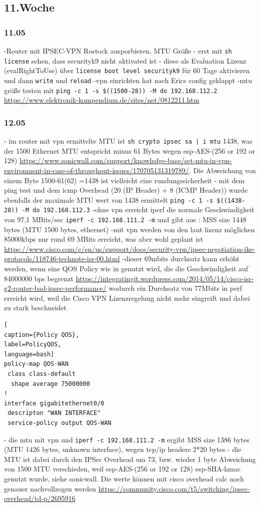 \documentclass[english,runningheads,a4paper]{llncs}[2018/03/10]
\begin{document}
\subsection{11.Woche}
\subsubsection{11.05}
-Router mit IPSEC-VPN Rostock ausporbieren, MTU Größe
- erst mit \texttt{sh license} sehen, dass securityk9 nicht aktivated ist
- diese als Evaluation Lizenz (evalRightToUse)  über \texttt{license boot level securityk9} für 60 Tage aktivieren und dann \texttt{write} und \texttt{reload}
-vpn einrichten hat nach Erics config geklappt
-mtu größe testen mit \texttt{ping -c 1 -s \$((1500-28)) -M do 192.168.112.2} \url{https://www.elektronik-kompendium.de/sites/net/0812211.htm}
\subsubsection{12.05}
- im router mit vpn ermittelte MTU ist \texttt{sh crypto ipsec sa | i mtu} 1438, was der 1500 Ethernet MTU entspricht minus 61 Bytes wegen esp-AES-(256 or 192 or 128) \url{https://www.sonicwall.com/support/knowledge-base/set-mtu-in-vpn-environment-in-case-of-throughput-issues/170705131319789/}. Die Abweichung von einem Byte 1500-61(62) =1438 ist vielleicht eine rundungssicherheit
- mit dem ping test und dem icmp Overhead (20 (IP Header) + 8 (ICMP Header)) wurde ebenfalls der maximale MTU wert von 1438 ermittelt \texttt{ping -c 1 -s \$((1438-28)) -M do 192.168.112.3}
-ohne vpn erreicht iperf die normale Geschwindigkeit von 97,1 MBits/sec \texttt{iperf -c 192.168.111.2 -m} und gibt aus :  MSS size 1448 bytes (MTU 1500 bytes, ethernet)
-mit vpn werden von den laut lizenz möglichen 85000kbps nur rund 69 MBits erreicht, was aber wohl geplant ist \url{https://www.cisco.com/c/en/us/support/docs/security-vpn/ipsec-negotiation-ike-protocols/118746-technote-isr-00.html}
-dieser 69mbits durchsatz kann erhöht werden, wenn eine QOS Policy wie in  genutzt wird, die die Geschwindigkeit auf 84000000 bps begrenzt \url{https://integratingit.wordpress.com/2014/05/14/cisco-isr-g2-router-bad-ipsec-performance/} wodurch ein Durchsatz von 77Mbits in perf erreicht wird, weil die Cisco VPN Lizenzregelung nicht mehr eingreift und dabei zu stark beschneidet
\begin{lstlisting}[
caption={Policy QOS},
label=PolicyQOS,
language=bash]
policy-map QOS-WAN
 class class-default
  shape average 75000000
!
interface gigabitethernet0/0
 descripton "WAN INTERFACE"
 service-policy output QOS-WAN
\end{lstlisting}
- die mtu mit vpn und \texttt{iperf -c 192.168.111.2 -m} ergibt  MSS size 1386 bytes (MTU 1426 bytes, unknown interface), wegen tcp/ip headers 2*20 bytes
- die MTU ist dabei durch den IPSec Overhead um 73, bzw. wieder 1 byte Abweichung von 1500 MTU verschieden, weil esp-AES-(256 or 192 or 128) esp-SHA-hmac genutzt wurde, siehe sonicwall. Die werte können mit cisco overhead calc noch genauer nachvollzogen werden \url{https://community.cisco.com/t5/switching/ipsec-overhead/td-p/2695916}
\end{document}
